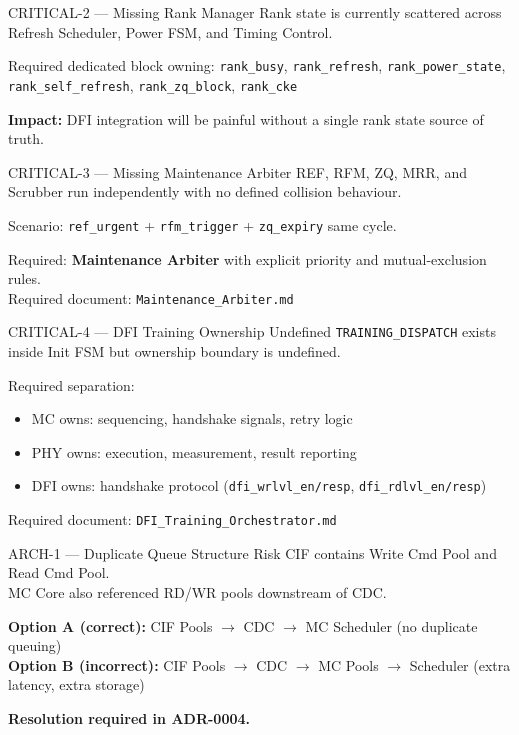 \documentclass[10pt,a4paper]{article}
\begin{document}
\vspace{4pt}
\begin{critbox}{CRITICAL-2 --- Missing Rank Manager}
Rank state is currently scattered across Refresh Scheduler, Power FSM, and Timing Control.

Required dedicated block owning:
\texttt{rank\_busy}, \texttt{rank\_refresh}, \texttt{rank\_power\_state},
\texttt{rank\_self\_refresh}, \texttt{rank\_zq\_block}, \texttt{rank\_cke}

\textbf{Impact:} DFI integration will be painful without a single rank state source of truth.
\end{critbox}

\vspace{4pt}
\begin{critbox}{CRITICAL-3 --- Missing Maintenance Arbiter}
REF, RFM, ZQ, MRR, and Scrubber run independently with no defined collision behaviour.

Scenario: \texttt{ref\_urgent} + \texttt{rfm\_trigger} + \texttt{zq\_expiry} same cycle.

Required: \textbf{Maintenance Arbiter} with explicit priority and mutual-exclusion rules.\\
Required document: \texttt{Maintenance\_Arbiter.md}
\end{critbox}

\vspace{4pt}
\begin{critbox}{CRITICAL-4 --- DFI Training Ownership Undefined}
\texttt{TRAINING\_DISPATCH} exists inside Init FSM but ownership boundary is undefined.

Required separation:
\begin{itemize}
  \item MC owns: sequencing, handshake signals, retry logic
  \item PHY owns: execution, measurement, result reporting
  \item DFI owns: handshake protocol (\texttt{dfi\_wrlvl\_en/resp}, \texttt{dfi\_rdlvl\_en/resp})
\end{itemize}
Required document: \texttt{DFI\_Training\_Orchestrator.md}
\end{critbox}

\vspace{4pt}
\begin{warnbox}{ARCH-1 --- Duplicate Queue Structure Risk}
CIF contains Write Cmd Pool and Read Cmd Pool.\\
MC Core also referenced RD/WR pools downstream of CDC.

\textbf{Option A (correct):} CIF Pools $\to$ CDC $\to$ MC Scheduler (no duplicate queuing)\\
\textbf{Option B (incorrect):} CIF Pools $\to$ CDC $\to$ MC Pools $\to$ Scheduler (extra latency, extra storage)

\textbf{Resolution required in ADR-0004.}
\end{warnbox}
\end{document}
